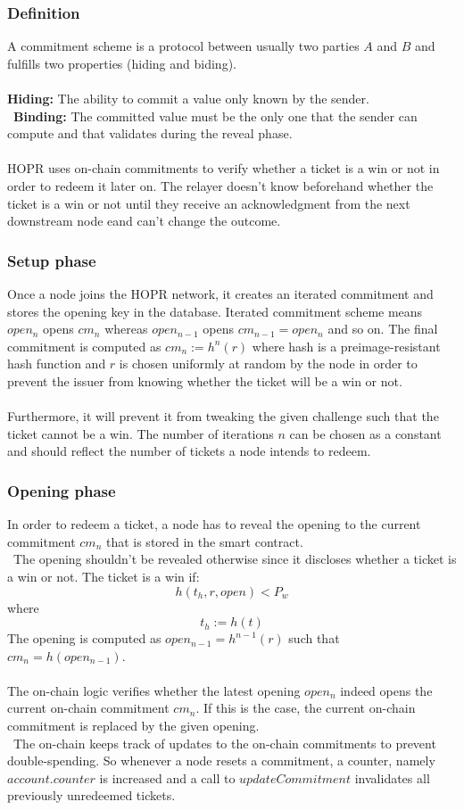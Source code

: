 \subsubsection*{Definition}
A commitment scheme is a protocol between usually two parties $A$ and $B$ and fulfills two properties (hiding and biding).
\\~\\\textbf{Hiding:} The ability to commit a value only known by the sender.
\\~\textbf{Binding:} The committed value must be the only one that the sender can compute and that validates during the reveal phase. 
\\~\\HOPR uses on-chain commitments to verify whether a ticket is a win or not in order to redeem it later on. The relayer doesn't know beforehand whether the ticket is a win or not until they receive an acknowledgment from the next downstream node eand can't change the outcome.
\subsubsection{Setup phase}
Once a node joins the HOPR network, it creates an iterated commitment and stores the opening key in the database. 
Iterated commitment scheme means $open_n$ opens $cm_n$ whereas $open_{n-1}$ opens $cm_{n-1}=open_n$ and so on. 
\newline The final commitment is computed as $cm_n:= h^n(r)$ where hash is a preimage-resistant hash function and 
$r$ is chosen uniformly at random by the node in order to prevent the issuer from knowing whether the ticket will be a win or not. 
\\~\\ Furthermore, it will prevent it from tweaking the given challenge such that the ticket cannot be a win.
The number of iterations $n$ can be chosen as a constant and should reflect the number of tickets a node intends to redeem.

\subsubsection{Opening phase}
In order to redeem a ticket, a node has to reveal the opening to the current commitment $cm_n$ that is stored in the smart contract. 
\\~The opening shouldn’t be revealed otherwise since it discloses whether a ticket is a win or not.
The ticket is a win if: $$h( t_h, r, open ) <P_w$$ where $$t_h:=h(t)$$
The opening is computed as $open_{n-1} = h^{n-1}(r)$ such that $cm_n=h( open_{n-1})$. 
\\~\\The on-chain logic verifies whether the latest opening $open_n$ indeed opens the current on-chain commitment $cm_n$. 
If this is the case, the current on-chain commitment is replaced by the given opening. 
\\~The on-chain keeps track of updates to the on-chain commitments to prevent double-spending. 
So whenever a node resets a commitment, a counter, namely $account.counter$ is increased and a call to $updateCommitment$ invalidates all previously unredeemed tickets.



